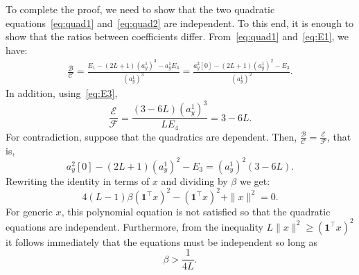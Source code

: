 \documentclass[12pt]{article}
\newcommand{\1}{\mathbf{1}}
\theoremstyle{plain}
\theoremstyle{definition}
\theoremstyle{remark}
\theoremstyle{plain}
\theoremstyle{remark}
\theoremstyle{plain}
\theoremstyle{plain}
\begin{document}
To complete the proof, we need to show that the two quadratic equations~\eqref{eq:quad1} and~\eqref{eq:quad2} are independent. To this end, it is enough to show that the ratios between coefficients differ. 
From~\eqref{eq:quad1} and~\eqref{eq:E1}, we have:
\begin{equation*}
\begin{split}
\frac{\mathcal{B}}{\mathcal{C}} = \frac{E_1 - (2L+1)(a_y^1)^3 - a_y^1E_3}{(a_y^1)^3} = \frac{a_y^2[0] - (2L+1)(a_y^1)^2 - E_3}{(a_y^1)^2}.
\end{split}
\end{equation*}
In addition, using~\eqref{eq:E3},
\begin{equation*}
\frac{\mathcal{E}}{\mathcal{F}} = \frac{(3-6L)(a_y^1)^3}{LE_4} = 3 - 6L . 
\end{equation*}
For contradiction, suppose that the quadratics are dependent. Then, $\frac{\mathcal{B}}{\mathcal{C}} =\frac{\mathcal{E}}{\mathcal{F}} $, that is, 	
\begin{equation*}
a_y^2[0] - (2L+1)(a_y^1)^2 - E_3 = (a_y^1)^2(3-6L).
\end{equation*}
Rewriting the identity in terms of $x$ and dividing by $\beta$ we get:
\begin{equation} \label{eq:cond}
4(L-1)\beta (\1^\top x)^2  - (\1^\top x)^2 + \|x\|^2 = 0.
\end{equation}	
For generic $x$,  this polynomial equation is not satisfied so that the quadratic equations are independent. 
Furthermore, from the inequality $L\|x\|^2 \ge (\1^\top x)^2$ it follows immediately that the equations must be independent so long as
\begin{equation*}
\beta > \frac{1}{4L}.
\end{equation*}
\end{document}
